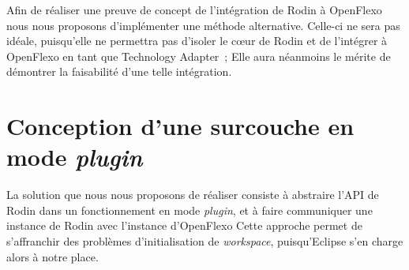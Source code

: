 Afin de réaliser une preuve de concept de l'intégration de Rodin à OpenFlexo nous nous proposons d'implémenter une méthode alternative.
Celle-ci ne sera pas idéale, puisqu'elle ne permettra pas d'isoler le cœur de Rodin et de l'intégrer à OpenFlexo en tant que Technology Adapter~; %
Elle aura néanmoins le mérite de démontrer la faisabilité d'une telle intégration.


\section{Conception d'une surcouche en mode \textit{plugin}}

La solution que nous nous proposons de réaliser consiste à abstraire l'API de Rodin dans un fonctionnement en mode \textit{plugin}, et à faire communiquer une instance de Rodin %
avec l'instance d'OpenFlexo
Cette approche permet de s'affranchir des problèmes d'initialisation de \textit{workspace}, puisqu'Eclipse s'en charge alors à notre place.

